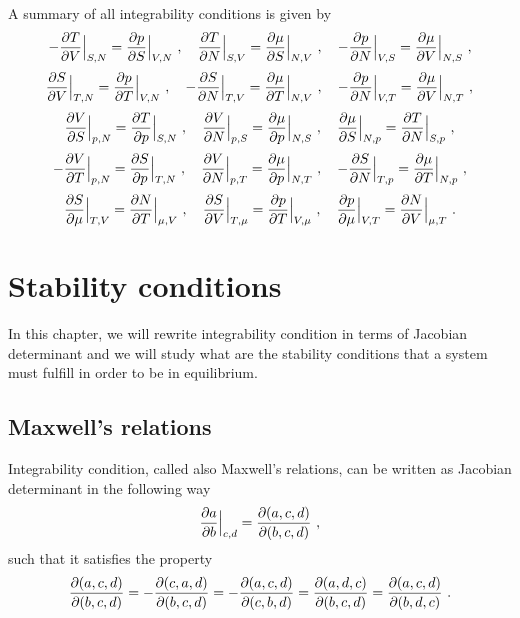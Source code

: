     A summary of all integrability conditions is given by 
    \begin{equation*}
        - \frac{\partial T}{\partial V} \Big \vert_{S,N} = \frac{\partial p}{\partial S} \Big \vert_{V,N} ~, \quad 
        \frac{\partial T}{\partial N} \Big \vert_{S,V} = \frac{\partial\mu}{\partial S} \Big \vert_{N, V} ~, \quad 
        - \frac{\partial p}{\partial N} \Big \vert_{V,S} = \frac{\partial\mu}{\partial V} \Big \vert_{N, S} ~,
    \end{equation*}
    \begin{equation*}
        \frac{\partial S}{\partial V} \Big \vert_{T,N} = \frac{\partial p}{\partial T} \Big \vert_{V,N} ~, \quad 
        - \frac{\partial S}{\partial N} \Big \vert_{T,V} = \frac{\partial\mu}{\partial T} \Big \vert_{N, V} ~, \quad 
        - \frac{\partial p}{\partial N} \Big \vert_{V,T} = \frac{\partial\mu}{\partial V} \Big \vert_{N, T} ~,
    \end{equation*}
    \begin{equation*}
        \frac{\partial V}{\partial S} \Big \vert_{p,N} = \frac{\partial T}{\partial p} \Big \vert_{S,N} ~, \quad 
        \frac{\partial V}{\partial N} \Big \vert_{p,S} = \frac{\partial\mu}{\partial p} \Big \vert_{N, S} ~, \quad 
        \frac{\partial\mu}{\partial S} \Big \vert_{N,p} = \frac{\partial T}{\partial N} \Big \vert_{S, p} ~,
    \end{equation*}
    \begin{equation*}
        - \frac{\partial V}{\partial T} \Big \vert_{p,N} = \frac{\partial S}{\partial p} \Big \vert_{T,N} ~, \quad 
        \frac{\partial V}{\partial N} \Big \vert_{p,T} = \frac{\partial\mu}{\partial p} \Big \vert_{N, T} ~, \quad 
        - \frac{\partial S}{\partial N} \Big \vert_{T,p} = \frac{\partial\mu}{\partial T} \Big \vert_{N, p} ~,
    \end{equation*}
    \begin{equation*}
        \frac{\partial S}{\partial\mu} \Big \vert_{T,V} = \frac{\partial N}{\partial T} \Big \vert_{\mu,V} ~, \quad 
        \frac{\partial S}{\partial V} \Big \vert_{T,\mu} = \frac{\partial p}{\partial T} \Big \vert_{V, \mu} ~, \quad 
        \frac{\partial p}{\partial\mu} \Big \vert_{V,T} = \frac{\partial N}{\partial V} \Big \vert_{\mu, T} ~.
    \end{equation*}

\chapter{Stability conditions}

    In this chapter, we will rewrite integrability condition in terms of Jacobian determinant and we will study what are the stability conditions that a system must fulfill in order to be in equilibrium.

\section{Maxwell's relations}

    Integrability condition, called also Maxwell's relations, can be written as Jacobian determinant in the following way 
    \begin{equation*}
        \frac{\partial a}{\partial b} \Big \vert_{c, d} = \frac{\partial(a, c, d)}{\partial(b, c, d)} ~,
    \end{equation*}
    such that it satisfies the property 
    \begin{equation*}
        \frac{\partial(a, c, d)}{\partial(b, c, d)} = - \frac{\partial(c, a, d)}{\partial(b, c, d)} = -\frac{\partial(a, c, d)}{\partial(c, b, d)} = \frac{\partial(a, d, c)}{\partial(b, c, d)} = \frac{\partial(a, c, d)}{\partial(b, d, c)} ~.
    \end{equation*}
    
